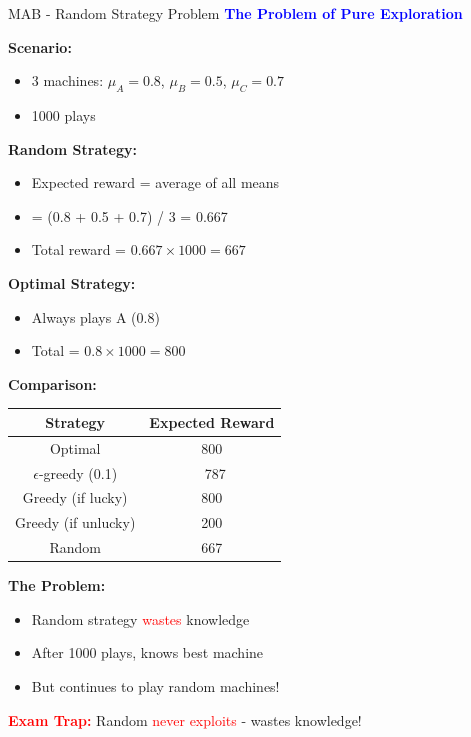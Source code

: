 \documentclass[8pt]{beamer}
\begin{document}
\begin{frame}{MAB - Random Strategy Problem}
\fontsize{6.5}{7.5}\selectfont
\textcolor{blue}{\textbf{The Problem of Pure Exploration}}

\textbf{Scenario:}
\begin{itemize}
\item 3 machines: $\mu_A = 0.8$, $\mu_B = 0.5$, $\mu_C = 0.7$
\item 1000 plays
\end{itemize}

\textbf{Random Strategy:}
\begin{itemize}
\item Expected reward = average of all means
\item = (0.8 + 0.5 + 0.7) / 3 = 0.667
\item Total reward = $0.667 \times 1000 = 667$
\end{itemize}

\textbf{Optimal Strategy:}
\begin{itemize}
\item Always plays A (0.8)
\item Total = $0.8 \times 1000 = 800$
\end{itemize}

\textbf{Comparison:}
\begin{tabular}{|c|c|}
\hline
Strategy & Expected Reward \\
\hline
Optimal & 800 \\
\hline
$\epsilon$-greedy (0.1) & ~787 \\
\hline
Greedy (if lucky) & 800 \\
\hline
Greedy (if unlucky) & 200 \\
\hline
Random & 667 \\
\hline
\end{tabular}

\textbf{The Problem:}
\begin{itemize}
\item Random strategy \textcolor{red}{wastes} knowledge
\item After 1000 plays, knows best machine
\item But continues to play random machines!
\end{itemize}

\textcolor{red}{\textbf{Exam Trap:}} Random \textcolor{red}{never exploits} - wastes knowledge!
\end{frame}
\end{document}
